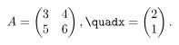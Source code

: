 \documentclass[preview]{standalone}
\begin{document}
\begin{align*}
A = \begin{pmatrix}3 & 4\\5 & 6\end{pmatrix}, \quadx = \begin{pmatrix}2 \\ 1\end{pmatrix}.
\end{align*}
\end{document}
